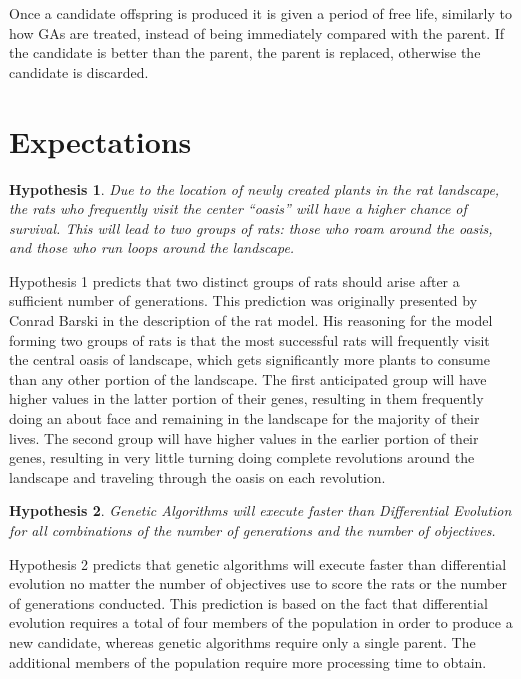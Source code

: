 \documentclass{sig-alternate}
\newtheorem{hyp}{Hypothesis}
\begin{document}
Once a candidate offspring is produced it is given a period of free life, similarly to how GAs are treated, instead of being immediately compared with the parent.  If the candidate is better than the parent, the parent is replaced, otherwise the candidate is discarded.

\section{Expectations}
\label{sec:Expectations}
\begin{hyp}
\begin{minipage}[t]{2.2 in}
Due to the location of newly created plants in the rat landscape, the rats who frequently visit the center ``oasis'' will have a higher chance of survival.  This will lead to two groups of rats: those who roam around the oasis, and those who run loops around the landscape.
\label{hyp:groups}
\end{minipage}
\end{hyp}

Hypothesis 1 predicts that two distinct groups of rats should arise after a sufficient number of generations.  This prediction was originally presented by Conrad Barski in the description of the rat model.\cite{LOL}  His reasoning for the model forming two groups of rats is that the most successful rats will frequently visit the central oasis of landscape, which gets significantly more plants to consume than any other portion of the landscape.  The first anticipated group will have higher values in the latter portion of their genes, resulting in them frequently doing an about face and remaining in the landscape for the majority of their lives.  The second group will have higher values in the earlier portion of their genes, resulting in very little turning doing complete revolutions around the landscape and traveling through the oasis on each revolution.

\begin{hyp}
\begin{minipage}[t]{2.2 in}
Genetic Algorithms will execute faster than Differential Evolution for all combinations of the number of generations and the number of objectives.
\label{hyp:faster}
\end{minipage}
\end{hyp}

Hypothesis 2 predicts that genetic algorithms will execute faster than differential evolution no matter the number of objectives use to score the rats or the number of generations conducted.  This prediction is based on the fact that differential evolution requires a total of four members of the population in order to produce a new candidate\cite{Das:DE}, whereas genetic algorithms require only a single parent.  The additional members of the population require more processing time to obtain.
\end{document}
